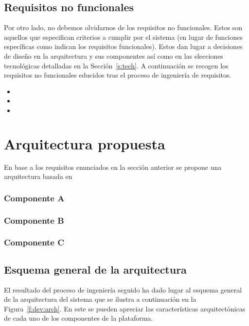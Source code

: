 \subsection{Requisitos no funcionales}
Por otro lado, no debemos olvidarnos de los requisitos no funcionales. Estos son aquellos que especifican criterios a cumplir por el sistema (en lugar de funciones específicas como indican los requisitos funcionales). Estos dan lugar a decisiones de diseño en la arquitectura y sus componentes así como en las elecciones tecnológicas detalladas en la Sección~\ref{s:tech}. A continuación se recogen los requisitos no funcionales educidos tras el proceso de ingeniería de requisitos.

\begin{itemize}
\item 
\item 
\item 
\end{itemize}

\section{Arquitectura propuesta}
\label{s:dev:arch}
En base a los requisitos enunciados en la sección anterior se propone una arquitectura basada en 

\subsubsection*{Componente A}


\subsubsection*{Componente B}


\subsubsection*{Componente C}



\subsection{Esquema general de la arquitectura}
El resultado del proceso de ingeniería seguido ha dado lugar al esquema general de la arquitectura del sistema que se ilustra a continuación en la Figura~\ref{f:dev:arch}. En este se pueden apreciar las características arquitectónicas de cada uno de los componentes de la plataforma.

